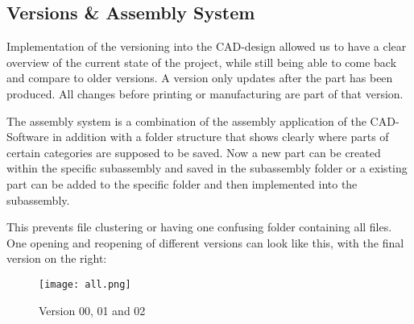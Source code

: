 \documentclass[../report.tex]{subfiles}
\begin{document}
\maketitle

\subsection{Versions \& Assembly System}
Implementation of  the versioning into the CAD-design allowed us to have a clear overview
of the current state of the project, while still being able to come back and compare to older 
versions. 
A version only updates after the part has been produced. All changes before 
printing or manufacturing are part of that version.

The assembly system is a combination of the assembly application of the CAD-Software
in addition with a folder structure that shows clearly where parts of certain categories 
are supposed to be saved. Now a new part can be created within the specific subassembly and 
saved in the subassembly folder or a existing part can be added to the specific folder and 
then implemented into the subassembly. 

This prevents file clustering or having one confusing folder containing all files. One opening 
and reopening of different versions can look like this, with the final version on the right:
\begin{figure}[H]
    \texttt{[image: all.png]}
    \caption{Version 00, 01 and 02}
\end{figure}
\end{document}
